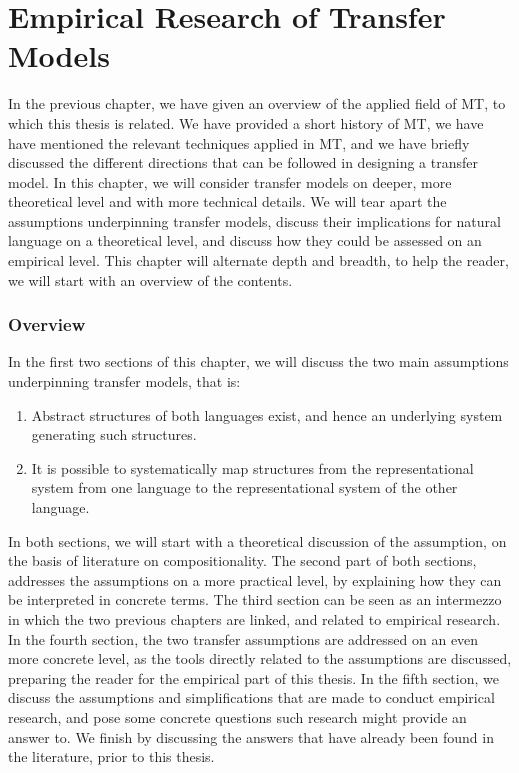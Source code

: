 \documentclass{report}
\theoremstyle{break}
\begin{document}
 
 
\chapter{Empirical Research of Transfer Models}
\label{ch:empirical} 

In the previous chapter, we have given an overview of the applied field of MT, to which this thesis is related. We have provided a short history of MT, we have have mentioned the relevant techniques applied in MT, and we have briefly discussed the different directions that can be followed in designing a transfer model. In this chapter, we will consider transfer models on deeper, more theoretical level and with more technical details. We will tear apart the assumptions underpinning transfer models, discuss their implications for natural language on a theoretical level, and discuss how they could be assessed on an empirical level. This chapter will alternate depth and breadth, to help the reader, we will start with an overview of the contents.

\subsection*{Overview}

In the first two sections of this chapter, we will discuss the two main assumptions underpinning transfer models, that is:

\begin{enumerate}
\item Abstract structures of both languages exist, and hence an underlying system generating such structures.
\item It is possible to systematically map structures from the representational system from one language to the representational system of the other language.
\end{enumerate}

In both sections, we will start with a theoretical discussion of the assumption, on the basis of literature on compositionality. The second part of both sections, addresses the assumptions on a more practical level, by explaining how they can be interpreted in concrete terms. The third section can be seen as an intermezzo in which the two previous chapters are linked, and related to empirical research. In the fourth section, the two transfer assumptions are addressed on an even more concrete level, as the tools directly related to the assumptions are discussed, preparing the reader for the empirical part of this thesis. In the fifth section, we discuss the assumptions and simplifications that are made to conduct empirical research, and pose some concrete questions such research might provide an answer to. We finish by discussing the answers that have already been found in the literature, prior to this thesis.
\end{document}
